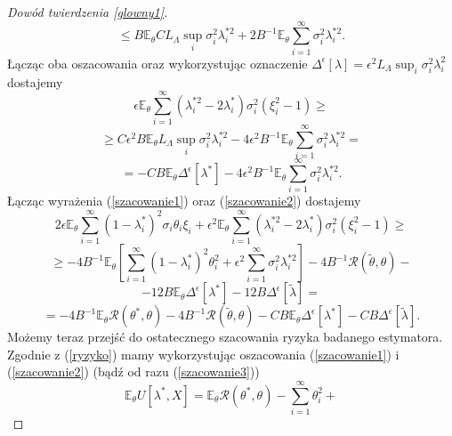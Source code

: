 \documentclass{mwart}
\begin{document}
\begin{proof}[Dowód twierdzenia \ref{glowny1}]
\begin{displaymath}
\leq B\mathbb{E}_{\theta}CL_{\Lambda}\sup_i\sigma_i^2\lambda_i^{*2}+2B^{-1}\mathbb{E}_{\theta}\sum_{i=1}^{\infty}\sigma_i^2\lambda_i^{*2}.
\end{displaymath}
Łącząc oba oszacowania oraz wykorzystując oznaczenie $\Delta^{\epsilon}[\lambda]=\epsilon^2L_{\Lambda}\sup_i\sigma_i^2\lambda_i^2$ dostajemy
\begin{displaymath}
\epsilon\mathbb{E}_{\theta}\sum_{i=1}^{\infty}(\lambda_i^{*2}-2\lambda_i^*)\sigma_i^2(\xi_i^2-1)\geq
\end{displaymath}
\begin{displaymath}
\geq C\epsilon^2 B\mathbb{E}_{\theta}L_{\Lambda}\sup_i\sigma_i^2\lambda_i^{*2}-4\epsilon^2B^{-1}\mathbb{E}_{\theta}\sum_{i=1}^{\infty}\sigma_i^2\lambda_i^{*2}=
\end{displaymath}
\begin{equation}\label{szacowanie2}
=-CB\mathbb{E}_{\theta}\Delta^{\epsilon}[\lambda^*]-4\epsilon^2B^{-1}\mathbb{E}_{\theta}\sum_{i=1}^{\infty}\sigma_i^2\lambda_i^{*2}.
\end{equation}
Łącząc wyrażenia (\ref{szacowanie1}) oraz (\ref{szacowanie2}) dostajemy
\begin{displaymath}
2\epsilon\mathbb{E}_{\theta}\sum_{i=1}^{\infty}(1-\lambda_i^*)^2\sigma_i\theta_i\xi_i+\epsilon^2\mathbb{E}_{\theta}\sum_{i=1}^{\infty}(\lambda_i^{*2}-2\lambda_i^*)\sigma_i^2(\xi_i^2-1)\geq
\end{displaymath}
\begin{displaymath}
\geq -4B^{-1}\mathbb{E}_{\theta}\left[\sum_{i=1}^{\infty}(1-\lambda_i^*)^2\theta_i^2+\epsilon^2\sum_{i=1}^{\infty}\sigma_i^2\lambda_i^{*2}\right]-4B^{-1}\mathcal{R}(\tilde{\theta},\theta)-
\end{displaymath}
\begin{displaymath}
-12B\mathbb{E}_{\theta}\Delta^{\epsilon}[\lambda^*]-12B\Delta^{\epsilon}[\tilde{\lambda}]=
\end{displaymath}
\begin{equation}\label{szacowanie3}
=-4B^{-1}\mathbb{E}_{\theta}\mathcal{R}(\theta^*,\theta)-4B^{-1}\mathcal{R}(\tilde{\theta},\theta)-CB\mathbb{E}_{\theta}\Delta^{\epsilon}[\lambda^*]-CB\Delta^{\epsilon}[\tilde{\lambda}].
\end{equation}
Możemy teraz przejść do ostatecznego szacowania ryzyka badanego estymatora. Zgodnie z (\ref{ryzyko}) mamy wykorzystując oszacowania (\ref{szacowanie1}) i (\ref{szacowanie2}) (bądź od razu (\ref{szacowanie3}))
\begin{displaymath}
\mathbb{E}_{\theta}U[\lambda^*,X]=\mathbb{E}_{\theta}\mathcal{R}(\theta^*,\theta)-\sum_{i=1}^{\infty}\theta_i^2+

\end{displaymath}
\end{proof}
\end{document}
